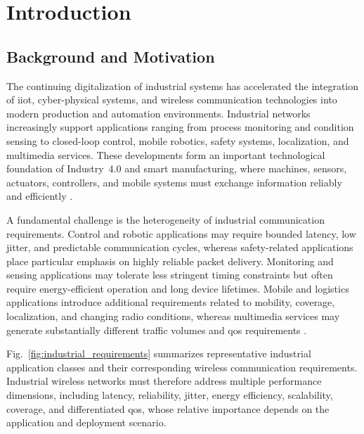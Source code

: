 \section{Introduction}
\label{sec:introduction}

\subsection{Background and Motivation}
\label{subsec:background_motivation}

The continuing digitalization of industrial systems has accelerated the integration of \gls{iiot}, cyber-physical systems, and wireless communication technologies into modern production and automation environments. Industrial networks increasingly support applications ranging from process monitoring and condition sensing to closed-loop control, mobile robotics, safety systems, localization, and multimedia services. These developments form an important technological foundation of Industry~4.0 and smart manufacturing, where machines, sensors, actuators, controllers, and mobile systems must exchange information reliably and efficiently \cite{xuInternetThingsIndustries2014, sisinniIndustrialInternetThings2018, boyesIndustrialInternetThings2018, wollschlaegerFutureIndustrialCommunication2017a}.

A fundamental challenge is the heterogeneity of industrial communication requirements. Control and robotic applications may require bounded latency, low jitter, and predictable communication cycles, whereas safety-related applications place particular emphasis on highly reliable packet delivery. Monitoring and sensing applications may tolerate less stringent timing constraints but often require energy-efficient operation and long device lifetimes. Mobile and logistics applications introduce additional requirements related to mobility, coverage, localization, and changing radio conditions, whereas multimedia services may generate substantially different traffic volumes and \gls{qos} requirements \cite{sisinniIndustrialInternetThings2018, wollschlaegerFutureIndustrialCommunication2017a}.

Fig.~\ref{fig:industrial_requirements} summarizes representative industrial application classes and their corresponding wireless communication requirements. Industrial wireless networks must therefore address multiple performance dimensions, including latency, reliability, jitter, energy efficiency, scalability, coverage, and differentiated \gls{qos}, whose relative importance depends on the application and deployment scenario.

